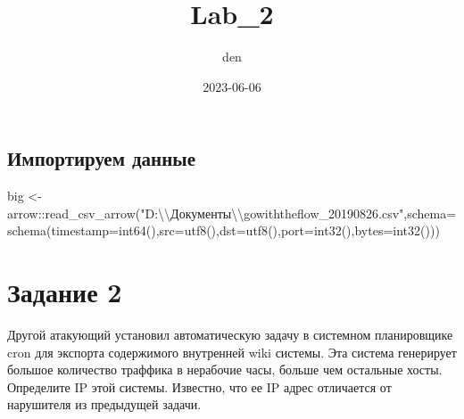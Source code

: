 \documentclass[
]{article}
\title{Lab\_2}
\author{den}
\date{2023-06-06}
\newenvironment{Shaded}{\begin{snugshade}}{\end{snugshade}}
\newcommand{\AttributeTok}[1]{\textcolor[rgb]{0.77,0.63,0.00}{#1}}
\newcommand{\FunctionTok}[1]{\textcolor[rgb]{0.00,0.00,0.00}{#1}}
\newcommand{\NormalTok}[1]{#1}
\newcommand{\OtherTok}[1]{\textcolor[rgb]{0.56,0.35,0.01}{#1}}
\newcommand{\SpecialCharTok}[1]{\textcolor[rgb]{0.00,0.00,0.00}{#1}}
\newcommand{\StringTok}[1]{\textcolor[rgb]{0.31,0.60,0.02}{#1}}
\begin{document}
\maketitle

\hypertarget{ux438ux43cux43fux43eux440ux442ux438ux440ux443ux435ux43c-ux434ux430ux43dux43dux44bux435}{%
\subsection{Импортируем
данные}\label{ux438ux43cux43fux43eux440ux442ux438ux440ux443ux435ux43c-ux434ux430ux43dux43dux44bux435}}

\begin{Shaded}
\begin{Highlighting}[]
\NormalTok{big }\OtherTok{\textless{}{-}}\NormalTok{ arrow}\SpecialCharTok{::}\FunctionTok{read\_csv\_arrow}\NormalTok{(}\StringTok{"D:}\SpecialCharTok{\textbackslash{}\textbackslash{}}\StringTok{Документы}\SpecialCharTok{\textbackslash{}\textbackslash{}}\StringTok{gowiththeflow\_20190826.csv"}\NormalTok{,}\AttributeTok{schema=}\FunctionTok{schema}\NormalTok{(}\AttributeTok{timestamp=}\FunctionTok{int64}\NormalTok{(),}\AttributeTok{src=}\FunctionTok{utf8}\NormalTok{(),}\AttributeTok{dst=}\FunctionTok{utf8}\NormalTok{(),}\AttributeTok{port=}\FunctionTok{int32}\NormalTok{(),}\AttributeTok{bytes=}\FunctionTok{int32}\NormalTok{()))}
\end{Highlighting}
\end{Shaded}

\hypertarget{ux437ux430ux434ux430ux43dux438ux435-2}{%
\section{Задание 2}\label{ux437ux430ux434ux430ux43dux438ux435-2}}

Другой атакующий установил автоматическую задачу в системном
планировщике cron для экспорта содержимого внутренней wiki системы. Эта
система генерирует большое количество траффика в нерабочие часы, больше
чем остальные хосты. Определите IP этой системы. Известно, что ее IP
адрес отличается от нарушителя из предыдущей задачи.
\end{document}
